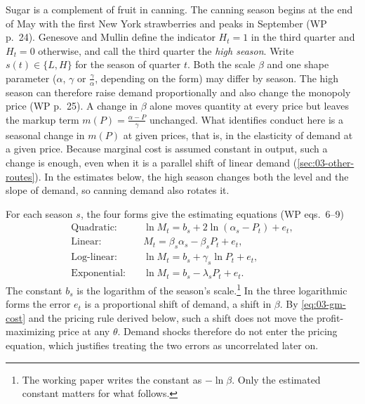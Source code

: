 Sugar is a complement of fruit in canning. The canning season begins at the end of May with the first New
York strawberries and peaks in September (WP p.~24). Genesove and Mullin define the indicator $H_t = 1$ in
the third quarter and $H_t = 0$ otherwise, and call the third quarter the \emph{high season}. Write
$s(t) \in \{L, H\}$ for the season of quarter $t$. Both the scale $\beta$ and one shape parameter ($\alpha$,
$\gamma$ or $\frac{\gamma}{\alpha}$, depending on the form) may differ by season. The high season can
therefore raise demand proportionally and also change the monopoly price (WP p.~25). A change in $\beta$
alone moves quantity at every price but leaves the markup term $m(P) = \frac{\alpha - P}{\gamma}$ unchanged.
What identifies conduct here is a seasonal change in $m(P)$ at given prices, that is, in the elasticity of
demand at a given price. Because marginal cost is assumed constant in output, such a change is enough, even
when it is a parallel shift of linear demand (\cref{sec:03-other-routes}). In the estimates below, the high
season changes both the level and the slope of demand, so canning demand also rotates it.

For each season $s$, the four forms give the estimating equations (WP eqs.~6--9)
\begin{align}
\text{Quadratic:}\quad & \ln M_t = b_s + 2\ln(\alpha_s - P_t) + e_t, \label{eq:03-gm-quad}\\
\text{Linear:}\quad & M_t = \beta_s\alpha_s - \beta_s P_t + e_t, \label{eq:03-gm-lin}\\
\text{Log-linear:}\quad & \ln M_t = b_s + \gamma_s \ln P_t + e_t, \label{eq:03-gm-loglin}\\
\text{Exponential:}\quad & \ln M_t = b_s - \lambda_s P_t + e_t. \label{eq:03-gm-exp}
\end{align}
The constant $b_s$ is the logarithm of the season's scale.\footnote{The working paper writes the constant as
$-\ln\beta$. Only the estimated constant matters for what follows.} In the three logarithmic forms the error
$e_t$ is a proportional shift of demand, a shift in $\beta$. By \eqref{eq:03-gm-cost} and the pricing rule
derived below, such a shift does not move the profit-maximizing price at any $\theta$. Demand shocks
therefore do not enter the pricing equation, which justifies treating the two errors as uncorrelated later
on.

